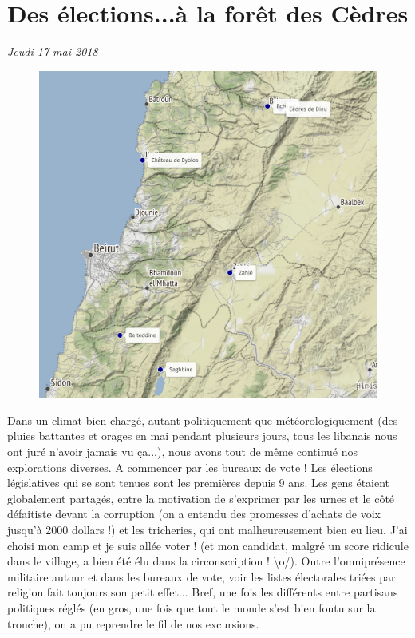 \hypertarget{des-uxe9lections...uxe0-la-foruxeat-des-cuxe8dres}{%
\section{Des élections...à la forêt des
Cèdres}\label{des-uxe9lections...uxe0-la-foruxeat-des-cuxe8dres}}

\emph{Jeudi 17 mai 2018}

\begin{figure}
\centering
\includegraphics{maps/Liban2.png}
\end{figure}

Dans un climat bien chargé, autant politiquement que météorologiquement
(des pluies battantes et orages en mai pendant plusieurs jours, tous les
libanais nous ont juré n'avoir jamais vu ça...), nous avons tout de même
continué nos explorations diverses. A commencer par les bureaux de vote
! Les élections législatives qui se sont tenues sont les premières
depuis 9 ans. Les gens étaient globalement partagés, entre la motivation
de s'exprimer par les urnes et le côté défaitiste devant la corruption
(on a entendu des promesses d'achats de voix jusqu'à 2000 dollars !) et
les tricheries, qui ont malheureusement bien eu lieu. J'ai choisi mon
camp et je suis allée voter ! (et mon candidat, malgré un score ridicule
dans le village, a bien été élu dans la circonscription !
\textbackslash{}o/). Outre l'omniprésence militaire autour et dans les
bureaux de vote, voir les listes électorales triées par religion fait
toujours son petit effet... Bref, une fois les différents entre
partisans politiques réglés (en gros, une fois que tout le monde s'est
bien foutu sur la tronche), on a pu reprendre le fil de nos excursions.

